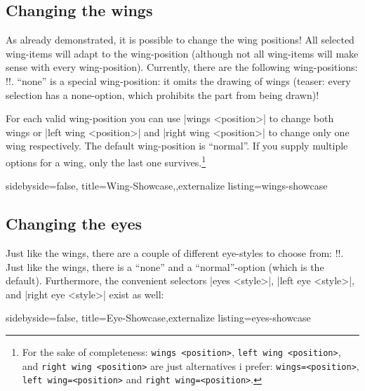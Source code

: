 \documentclass[parskip=half,english,numbers=noenddot,footnotes=nomultiple,oneside]{scrartcl}
\makeatletter
\let\say\enquote
\def\DTLlistformatitem#1{\textit{#1}}
\newcommand*\typesetselection[1][]{\begingroup\ifx!#1!\else\def\DTLlistformatitem##1{#1}\fi\dotypesetselection}
\def\dotypesetselection#1{\expandafter\DTLformatlist\expandafter{\csname @pingu@#1@\endcsname}\endgroup}
\def\ipingu#1{\lstinline'#1'}
\makeatother
\begin{document}
\subsection{Changing the wings}
\label{subsec:wings}As already demonstrated, it is possible to change the wing positions!
All selected wing-items will adapt to the wing-position (although not all wing-items will make sense with every wing-position).
Currently, there are the following wing-positions:
\typesetselection{leftwing}. \say{none} is a special wing-position: it omits the drawing of wings (teaser: every selection has a none-option, which prohibits the part from being drawn)!

For each valid wing-position you can use |wings <position>| to change both wings or |left wing <position>| and |right wing <position>| to change only one wing respectively. The default wing-position is \say{normal}. If you supply multiple options for a wing, only the last one survives.\footnote{For the sake of completeness: \ipingu{wings <position>}, \ipingu{left wing <position>}, and \ipingu{right wing <position>} are just alternatives i prefer: \ipingu{wings=<position>}, \ipingu{left wing=<position>} and \ipingu{right wing=<position>}.}
\begin{tcblisting}{sidebyside=false, title=Wing-Showcase,,externalize listing=wings-showcase}
\begin{tikzpicture}
	\pingu[left wing none, heart=green]
	\pingu[wings wave, heart=teal, xshift=3.5cm]
	\pingu[wings hug, heart=orange, xshift=7cm]
	\pingu[left wing grab, right wing shock, heart=purple,  xshift=10.5cm]
\end{tikzpicture}
\end{tcblisting}

\subsection{Changing the eyes}
\label{mrk:pengu-eye}Just like the wings, there are a couple of different eye-styles to choose from: \typesetselection{lefteye}. Just like the wings, there is a \say{none} and a \say{normal}-option (which is the default).
Furthermore, the convenient selectors |eyes <style>|, |left eye <style>|, and |right eye <style>| exist as well:
\begin{tcblisting}{sidebyside=false, title=Eye-Showcase,externalize listing=eyes-showcase}
\begin{tikzpicture}
	\pingu[left eye none, heart=green]
	\pingu[eyes wink, heart=teal, xshift=3.5cm]
	\pingu[eyes shock, heart=orange, xshift=7cm]
	\pingu[left eye devil, right eye angry, heart=purple,  xshift=10.5cm]
\end{tikzpicture}
\end{tcblisting}
\end{document}
